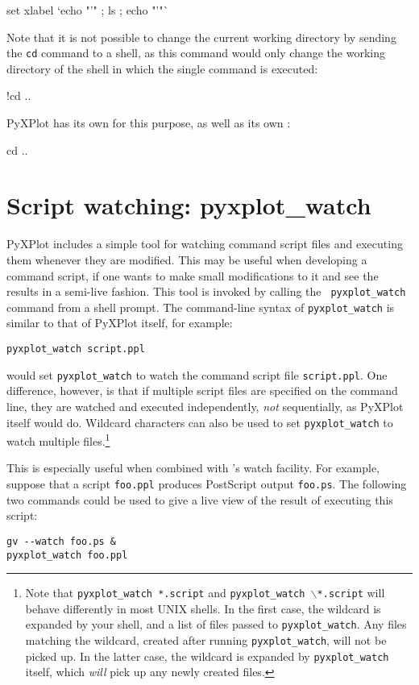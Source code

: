 \begin{dodo}
set xlabel `echo "'" ; ls ; echo "'"`
\end{dodo}

Note that it is not possible to change the current working directory by sending
the {\tt cd} command to a shell, as this command would only change the working
directory of the shell in which the single command is executed:

\begin{dontdo}
!cd ..
\end{dontdo}

\noindent PyXPlot has its own  for this purpose, as well as its own
:

\begin{dodo}
cd ..
\end{dodo}

\section{Script watching: pyxplot\_watch}

PyXPlot includes a simple tool for watching command script files and executing
them whenever they are modified. This may be useful when developing a command
script, if one wants to make small modifications to it and see the results in a
semi-live fashion. This tool is invoked by calling the {\tt
pyxplot\_watch} command from a
shell prompt. The command-line syntax of {\tt pyxplot\_watch} is similar to
that of PyXPlot itself, for example:

\begin{verbatim}
pyxplot_watch script.ppl
\end{verbatim}

\noindent would set {\tt pyxplot\_watch} to watch the command script file
{\tt script.ppl}. One difference, however, is that if multiple script files are
specified on the command line, they are watched and executed independently,
\textit{not} sequentially, as PyXPlot itself would do. Wildcard characters can
also be used to set {\tt pyxplot\_watch} to watch multiple
files.\footnote{Note that {\tt pyxplot\_watch *.script} and
{\tt pyxplot\_watch $\backslash$*.script} will behave differently in most
UNIX shells.  In the first case, the wildcard is expanded by your shell, and a
list of files passed to {\tt pyxplot\_watch}. Any files matching the
wildcard, created after running {\tt pyxplot\_watch}, will not be picked up.
In the latter case, the wildcard is expanded by {\tt pyxplot\_watch} itself,
which {\it will} pick up any newly created files.}

This is especially useful when combined with \ghostview's
watch facility. For example, suppose that a script {\tt foo.ppl} produces
PostScript output {\tt foo.ps}. The following two commands could be used to
give a live view of the result of executing this script:

\begin{verbatim}
gv --watch foo.ps &
pyxplot_watch foo.ppl
\end{verbatim}

